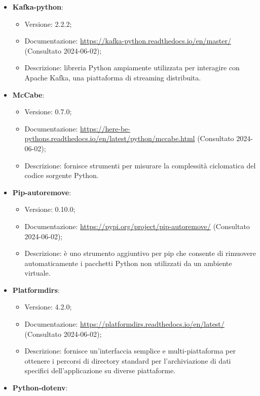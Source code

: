 \begin{itemize}
\begin{itemize}
    \end{itemize}
    \item \textbf{Kafka-python}:
    \begin{itemize}
        \item Versione: 2.2.2;
        \item Documentazione: \url{https://kafka-python.readthedocs.io/en/master/} (Consultato 2024-06-02);
        \item Descrizione: libreria Python ampiamente utilizzata per interagire con Apache Kafka, una piattaforma di streaming distribuita. 
    \end{itemize}
    \item \textbf{McCabe}:
    \begin{itemize}
        \item Versione: 0.7.0;
        \item Documentazione: \url{https://here-be-pythons.readthedocs.io/en/latest/python/mccabe.html} (Consultato 2024-06-02);
        \item Descrizione: fornisce strumenti per misurare la complessità ciclomatica del codice sorgente Python.
    \end{itemize}
    \item \textbf{Pip-autoremove}:
    \begin{itemize}
        \item Versione: 0.10.0;
        \item Documentazione: \url{https://pypi.org/project/pip-autoremove/} (Consultato 2024-06-02);
        \item Descrizione: è uno strumento aggiuntivo per pip che consente di rimuovere automaticamente i pacchetti Python non utilizzati da un ambiente virtuale.
    \end{itemize}
    \item \textbf{Platformdirs}:
    \begin{itemize}
        \item Versione: 4.2.0;
        \item Documentazione: \url{https://platformdirs.readthedocs.io/en/latest/} (Consultato 2024-06-02);
        \item Descrizione: fornisce un'interfaccia semplice e multi-piattaforma per ottenere i percorsi di directory standard per l'archiviazione di dati specifici dell'applicazione su diverse piattaforme.
    \end{itemize}
    \item \textbf{Python-dotenv}:
    \begin{itemize}

\end{itemize}
\end{itemize}

